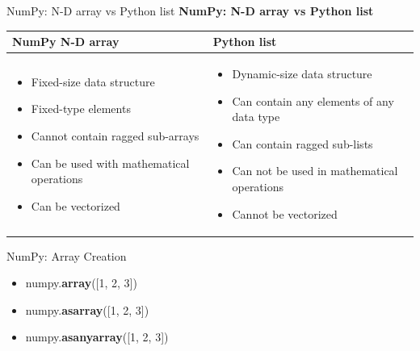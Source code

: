 \documentclass{beamer}
\begin{document}
    \begin{frame}[fragile]{NumPy: N-D array vs Python list}
        \textbf{NumPy: N-D array vs Python list}
        \begin{tabular}{ |p{5.7cm}|p{5.7cm}| }
            \hline
            \textbf{NumPy N-D array} & \textbf{Python list} \\
            \hline
            \begin{itemize}
                \item Fixed-size data structure
                \item Fixed-type elements
                \item Cannot contain ragged sub-arrays
                \item Can be used with mathematical operations
                \item Can be vectorized
            \end{itemize} & \begin{itemize}
                \item Dynamic-size data structure
                \item Can contain any elements of any data type
                \item Can contain ragged sub-lists
                \item Can not be used in mathematical operations
                \item Cannot be vectorized
            \end{itemize} \\
            \hline
        \end{tabular}
    \end{frame}
    \begin{frame}[fragile]{NumPy: Array Creation}
        \begin{example}
            \begin{itemize}
                \item numpy.\textbf{array}([1, 2, 3])
                \item numpy.\textbf{asarray}([1, 2, 3])
                \item numpy.\textbf{asanyarray}([1, 2, 3])
            \end{itemize}
        \end{example}
    \end{frame}
\end{document}
